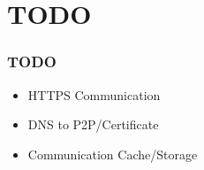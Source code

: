 \section{TODO}
\begin{frame}
	\frametitle{TODO}
	\begin{itemize} 
		\item HTTPS Communication
		\item DNS to P2P/Certificate
		\item Communication Cache/Storage
	\end{itemize}
\end{frame}



